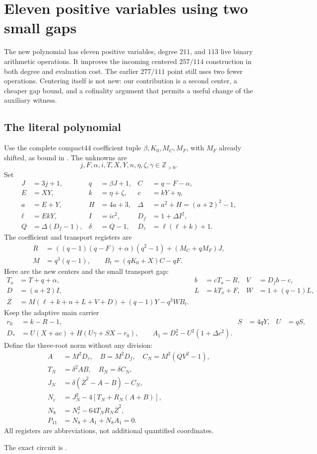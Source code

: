 \documentclass[11pt]{article}
\begin{document}
\section{Eleven positive variables using two small gaps}
\label{sec:positive211}
The new polynomial has eleven positive variables, degree $211$, and $113$
live binary arithmetic operations.  It improves the incoming centered
$257/114$ construction in both degree and evaluation cost.  The earlier
$277/111$ point still uses two fewer operations.  Centering itself is not
new: our contribution is a second center, a cheaper gap bound, and a
cofinality argument that permits a useful change of the auxiliary witness.

\subsection{The literal polynomial}
Use the complete compact44 coefficient tuple
$\beta,K_0,M_C,M_F$, with $M_F$ already shifted, as bound in
.  The unknowns are
\[
 j,F,\alpha,i,T,X,Y,n,\eta,\zeta,\gamma\in\mathbb Z_{>0}.
\]
Set
\begin{align*}
 J&=3j+1,&q&=\beta J+1,&C&=q-F-\alpha,\\
 E&=XY,&k&=\eta+\zeta,&c&=kY+\eta,\\
 a&=E+Y,&H&=4a+3,&\Delta&=a^2+H=(a+2)^2-1,\\
 \ell&=EkY,&I&=ic^2,&D_f&=1+\Delta I^2,\\
 Q&=\Delta(D_f-1),&\delta&=Q-1,&D_\tau&=\ell(\ell+k)+1.
\end{align*}
The coefficient and transport registers are
\begin{align*}
 R&=((q-1)(q-F)+\alpha)(q^2-1)+(M_C+qM_F)J,\\
 M&=q^3(q-1),\qquad B_t=(qK_0+X)C-qF.
\end{align*}
Here are the new centers and the small transport gap:
\begin{align*}
 T_o&=T+q+\alpha,& b&=cT_o-R,&V&=D_f b-c,\\
 D&=(a+2)I,&L&=kT_o+F,&W&=1+(q-1)L,\\
 \overline Z&=M(\ell+k+n+L+V+D)+(q-1)Y-q^3WB_t.
\end{align*}
Keep the adaptive main carrier
\begin{align*}
 r_0&=k-R-1,&S&=4qY,&U&=qS,\\
 D_*&=U(X+ac)+H(U\gamma+SX-r_0),\qquad
 A_1=D_*^2-U^2(1+\Delta c^2).
\end{align*}
Define the three-root norm without any division:
\begin{align*}
 A&=M^2D_\tau,\quad B=M^2D_f,\quad C_N=M^2(QV^2-1),\\
 T_N&=\delta^2AB,\quad R_N=\delta C_N,\\
 J_N&=\delta(\overline Z^2-A-B)-C_N,\\
 N_c&=J_N^2-4[T_N+R_N(A+B)],\\
 N_8&=N_c^2-64T_NR_N\overline Z^2,\\
 \boxed{P_{11}}&\boxed{=N_8+A_1+N_8A_1=0.}
\end{align*}
All registers are abbreviations, not additional quantified coordinates.
\par The exact circuit is .
\end{document}
